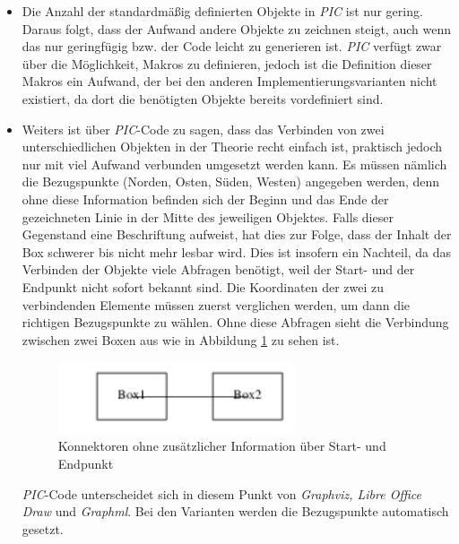 \begin{itemize}
	\item Die Anzahl der standardmäßig definierten Objekte in \textit{PIC} ist nur gering. Daraus folgt, dass der Aufwand andere Objekte zu zeichnen steigt, auch wenn das nur geringfügig bzw. der Code leicht zu generieren ist. \textit{PIC} verfügt zwar über die Möglichkeit, Makros zu definieren, jedoch ist die Definition dieser Makros ein Aufwand, der bei den anderen Implementierungsvarianten nicht existiert, da dort die benötigten Objekte bereits vordefiniert sind.
	\\
	\pra
	\item Weiters ist über \textit{PIC}-Code zu sagen, dass das Verbinden von zwei unterschiedlichen Objekten in der Theorie recht einfach ist, praktisch jedoch nur mit viel Aufwand verbunden umgesetzt werden kann. Es müssen nämlich die Bezugspunkte (Norden, Osten, Süden, Westen) angegeben werden, denn ohne diese Information befinden sich der Beginn und das Ende der gezeichneten Linie in der Mitte des jeweiligen Objektes. Falls dieser Gegenstand eine Beschriftung aufweist, hat dies zur Folge, dass der Inhalt der Box schwerer bis nicht mehr lesbar wird. Dies ist insofern ein Nachteil, da das Verbinden der Objekte viele Abfragen benötigt, weil der Start- und der Endpunkt nicht sofort bekannt sind. Die Koordinaten der zwei zu verbindenden Elemente müssen zuerst verglichen werden, um dann die richtigen Bezugspunkte zu wählen. 
	Ohne diese Abfragen sieht die Verbindung zwischen zwei Boxen aus wie in Abbildung \ref{ConnProb} zu sehen ist.
	\begin{figure}[h!]
		\begin{center}
			\includegraphics[width=7cm]{images/Connectoren_Problem.png}
			\caption{Konnektoren ohne zusätzlicher Information über Start- und Endpunkt}
			\label{ConnProb}
		\end{center}
	\end{figure}

	\noindent
	\textit{PIC}-Code unterscheidet sich in diesem Punkt von \textit{Graphviz, Libre Office Draw} und \textit{Graphml}. Bei den Varianten werden die Bezugspunkte automatisch gesetzt.
	\\
	

\end{itemize}
